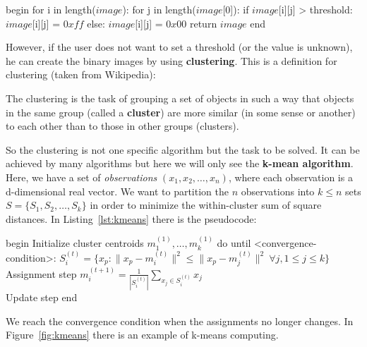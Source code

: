 \begin{pseudo}[caption={Image Thresholding}, label={lst:Thresholding}]
begin
 for i in length($image$):
   for j in length($image$[0]):
     if $image$[i][j] > threshold:
       $image$[i][j] = $0xff$
     else:
       $image$[i][j] = $0x00$
 return $image$
end       
\end{pseudo}

However, if the user does not want to set a threshold (or the value is unknown), he can create the binary images by using \textbf{clustering}. This is a definition for clustering (taken from Wikipedia):
\begin{definition}[Clustering]
 The clustering is the task of grouping a set of objects in such a way that objects in the same group (called a \textbf{cluster}) are more similar (in some sense or another) to each other than to those in other groups (clusters).
\end{definition}

So the clustering is not one specific algorithm but the task to be solved. It can be achieved by many algorithms but here we will only see the \textbf{k-mean algorithm}. Here, we have a set of \textit{observations} $(x_1,x_2,\dots,x_n)$, where each observation is a d-dimensional real vector. We want to partition the $n$ observations into $k \leq n$ sets $S = \{S_1,S_2,\dots,S_k \}$ in order to minimize the within-cluster sum of square distances. In Listing~\ref{lst:kmeans} there is the pseudocode:

\begin{pseudo}[caption={K-means algorithm}, label={lst:kmeans}]
begin
  Initialize cluster centroids $m_1^{(1)},\dots,m_k^{(1)}$
  do until <convergence-condition>:
    $S_i^{(t)} = \{ x_p \colon \| x_p - m^{(t)}_i \|^2 \le \| x_p - m^{(t)}_j \|^2 \ \forall j, 1 \le j \le k \}$ \\ Assignment step
    $m^{(t+1)}_i = \displaystyle\frac{1}{|S^{(t)}_i|} \displaystyle\sum_{x_j \in S^{(t)}_i} x_j$ \\ Update step
end       
\end{pseudo}

We reach the convergence condition when the assignments no longer changes. In Figure~\ref{fig:kmeans} there is an example of k-means computing.

